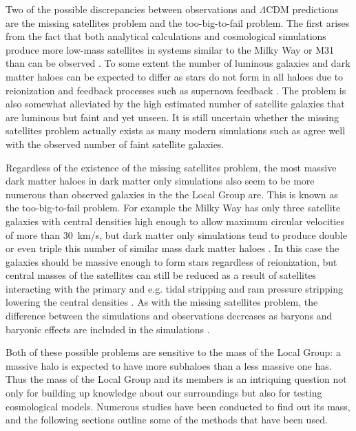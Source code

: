 \documentclass[english, twoside]{HYgradu}
\begin{document}
Two of the possible discrepancies between observations and $\Lambda$CDM predictions are the missing satellites problem and the too-big-to-fail problem. The first arises from the fact that both analytical calculations and cosmological simulations produce more low-mass satellites in systems similar to the Milky Way or M31 than can be observed \citep{klypin1999missing}. To some extent the number of luminous galaxies and dark matter haloes can be expected to differ as stars do not form in all haloes due to reionization and feedback processes such as supernova feedback \citep{efstathiou1992suppressing, larson1974effects}. The problem is also somewhat alleviated by the high estimated number of satellite galaxies that are luminous but faint and yet unseen. It is still uncertain whether the missing satellites problem actually exists as many modern simulations such as \citep{sawala2016apostle} agree well with the observed number of faint satellite galaxies.

Regardless of the existence of the missing satellites problem, the most massive dark matter haloes in dark matter only simulations also seem to be more numerous than observed galaxies in the the Local Group are. This is known as the too-big-to-fail problem. For example the Milky Way has only three satellite galaxies with central densities high enough to allow maximum circular velocities of more than 30~km/s, but dark matter only simulations tend to produce double or even triple this number of similar mass dark matter haloes \citep{sawala2016apostle}. In this case the galaxies should be massive enough to form stars regardless of reionization, but central masses of the satellites can still be reduced as a result of satellites interacting with the primary and e.g. tidal stripping and ram pressure stripping lowering the central densities \citep{bullock2017small}. As with the missing satellites problem, the difference between the simulations and observations decreases as baryons and baryonic effects are included in the simulations \citep{sawala2016apostle}.

Both of these possible problems are sensitive to the mass of the Local Group: a massive halo is expected to have more subhaloes than a less massive one has. Thus the mass of the Local Group and its members is an intriquing question not only for building up knowledge about our surroundings but also for testing cosmological models. Numerous studies have been conducted to find out its mass, and the following sections outline some of the methods that have been used.
\end{document}
